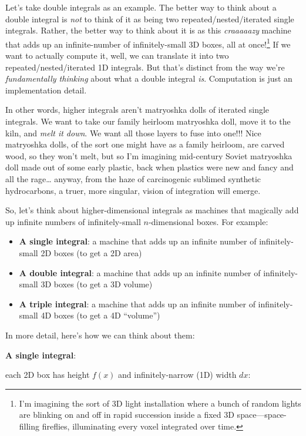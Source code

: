 \documentclass[
]{article}
\providecommand{\tightlist}{%
  \setlength{\itemsep}{0pt}\setlength{\parskip}{0pt}}
\begin{document}
Let's take double integrals as an example. The better way to think about a double integral is \emph{not} to think of it as being two repeated/nested/iterated single integrals. Rather, the better way to think about it is as this \emph{craaaaazy} machine that adds up an infinite-number of infinitely-small 3D boxes, all at once!\footnote{I'm imagining the sort of 3D light installation where a bunch of random lights are blinking on and off in rapid succession inside a fixed 3D space---space-filling fireflies, illuminating every voxel integrated over time.} If we want to actually compute it, well, we can translate it into two repeated/nested/iterated 1D integrals. But that's distinct from the way we're \emph{fundamentally thinking} about what a double integral \emph{is}. Computation is just an implementation detail.

In other words, higher integrals aren't matryoshka dolls of iterated single integrals. We want to take our family heirloom matryoshka doll, move it to the kiln, and \emph{melt it down}. We want all those layers to fuse into one!!! Nice matryoshka dolls, of the sort one might have as a family heirloom, are carved wood, so they won't melt, but so I'm imagining mid-century Soviet matryoshka doll made out of some early plastic, back when plastics were new and fancy and all the rage\ldots{} anyway, from the haze of carcinogenic sublimed synthetic hydrocarbons, a truer, more singular, vision of integration will emerge.

So, let's think about higher-dimensional integrals as machines that magically add up infinite numbers of infinitely-small \(n\)-dimensional boxes. For example:

\begin{itemize}
\tightlist
\item
  \textbf{A single integral}: a machine that adds up an infinite number of infinitely-small 2D boxes (to get a 2D area)
\item
  \textbf{A double integral}: a machine that adds up an infinite number of infinitely-small 3D boxes (to get a 3D volume)
\item
  \textbf{A triple integral}: a machine that adds up an infinite number of infinitely-small 4D boxes (to get a 4D ``volume'')
\end{itemize}

In more detail, here's how we can think about them:

\textbf{A single integral}:

each 2D box has height \(f(x)\) and infinitely-narrow (1D) width \(dx\):
\end{document}
